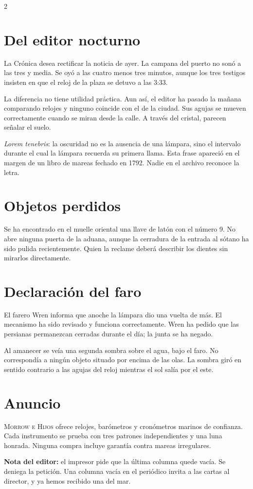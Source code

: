 \begin{multicols}{2}
\section*{Del editor nocturno}
La Crónica desea rectificar la noticia de ayer. La campana del puerto no
sonó a las tres y media. Se oyó a las cuatro menos tres minutos, aunque los
tres testigos insisten en que el reloj de la plaza se detuvo a las 3:33.

La diferencia no tiene utilidad práctica. Aun así, el editor ha pasado la
mañana comparando relojes y ninguno coincide con el de la ciudad. Sus agujas
se mueven correctamente cuando se miran desde la calle. A través del cristal,
parecen señalar el suelo.

\textit{Lorem tenebris}: la oscuridad no es la ausencia de una lámpara, sino
el intervalo durante el cual la lámpara recuerda su primera llama. Esta
frase apareció en el margen de un libro de mareas fechado en 1792. Nadie en
el archivo reconoce la letra.

\section*{Objetos perdidos}
Se ha encontrado en el muelle oriental una llave de latón con el número 9.
No abre ninguna puerta de la aduana, aunque la cerradura de la entrada al
sótano ha sido pulida recientemente. Quien la reclame deberá describir los
dientes sin mirarlos directamente.

\columnbreak
\section*{Declaración del faro}
El farero Wren informa que anoche la lámpara dio una vuelta de más. El
mecanismo ha sido revisado y funciona correctamente. Wren ha pedido que las
persianas permanezcan cerradas durante el día; la junta se ha negado.

Al amanecer se veía una segunda sombra sobre el agua, bajo el faro. No
correspondía a ningún objeto situado por encima de las olas. La sombra giró
en sentido contrario a las agujas del reloj mientras el sol salía por el
este.

\section*{Anuncio}
\textsc{Morrow e Hijos} ofrece relojes, barómetros y cronómetros marinos de
confianza. Cada instrumento se prueba con tres patrones independientes y
una luna honrada. Ninguna compra incluye garantía contra mareas irregulares.

\textbf{Nota del editor:} el impresor pide que la última columna quede
vacía. Se deniega la petición. Una columna vacía en el periódico invita a
las cartas al director, y ya hemos recibido una del mar.
\end{multicols}
